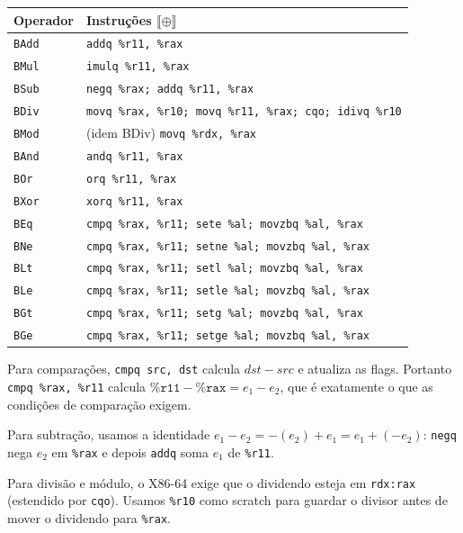 \begin{center}
  \begin{tabular}{ll}
    \toprule
    Operador & Instruções $\llbracket\oplus\rrbracket$ \\
    \midrule
    \texttt{BAdd} & \texttt{addq \%r11, \%rax} \\
    \texttt{BMul} & \texttt{imulq \%r11, \%rax} \\
    \texttt{BSub} & \texttt{negq \%rax; addq \%r11, \%rax} \\
    \texttt{BDiv} & \texttt{movq \%rax, \%r10; movq \%r11, \%rax;
    cqo; idivq \%r10} \\
    \texttt{BMod} & (idem BDiv) \texttt{movq \%rdx, \%rax} \\
    \texttt{BAnd} & \texttt{andq \%r11, \%rax} \\
    \texttt{BOr}  & \texttt{orq \%r11, \%rax} \\
    \texttt{BXor} & \texttt{xorq \%r11, \%rax} \\
    \texttt{BEq}  & \texttt{cmpq \%rax, \%r11; sete \%al; movzbq \%al, \%rax} \\
    \texttt{BNe}  & \texttt{cmpq \%rax, \%r11; setne \%al; movzbq
    \%al, \%rax} \\
    \texttt{BLt}  & \texttt{cmpq \%rax, \%r11; setl \%al; movzbq \%al, \%rax} \\
    \texttt{BLe}  & \texttt{cmpq \%rax, \%r11; setle \%al; movzbq
    \%al, \%rax} \\
    \texttt{BGt}  & \texttt{cmpq \%rax, \%r11; setg \%al; movzbq \%al, \%rax} \\
    \texttt{BGe}  & \texttt{cmpq \%rax, \%r11; setge \%al; movzbq
    \%al, \%rax} \\
    \bottomrule
  \end{tabular}
\end{center}

Para comparações, \texttt{cmpq src, dst} calcula $\mathit{dst} - \mathit{src}$
e atualiza as flags. Portanto \texttt{cmpq \%rax, \%r11} calcula
$\texttt{\%r11} - \texttt{\%rax} = e_1 - e_2$, que é exatamente o que
as condições de comparação exigem.

Para subtração, usamos a identidade $e_1 - e_2 = -(e_2) + e_1 = e_1 + (-e_2)$:
\texttt{negq} nega $e_2$ em \texttt{\%rax} e depois \texttt{addq} soma $e_1$
de \texttt{\%r11}.

Para divisão e módulo, o X86-64 exige que o dividendo esteja em
\texttt{rdx:rax} (estendido por \texttt{cqo}). Usamos \texttt{\%r10} como
scratch para guardar o divisor antes de mover o dividendo para \texttt{\%rax}.

